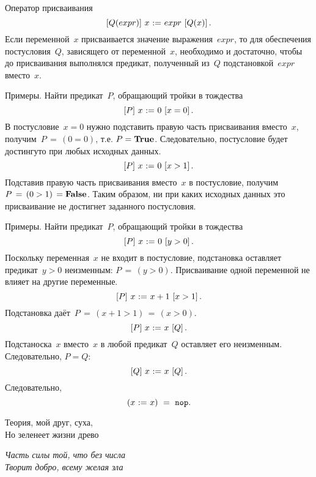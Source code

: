 \documentclass[landscape]{slides}
\begin{document}
\begin{slide}
        Оператор присваивания
        \[
                \left[ Q(expr) \right] \, {x\ \mathtt{:=}\  expr} \, \left[ Q(x) \right] .
        \]
        Если переменной~$x$ присваивается значение выражения~$expr$, то для обеспечения постусловия~$Q$, зависящего от переменной~$x$, необходимо и
        достаточно, чтобы до присваивания выполнялся предикат, полученный из~$Q$ подстановкой~$expr$ вместо~$x$.

        Примеры. Найти предикат~$P$, обращающий тройки в тождества
        \[
                \left[ P \right] \, {x\ \mathtt{:=}\  0} \, \left[ x=0 \right] .
        \]
        В постусловие~$x=0$ нужно подставить правую часть присваивания вместо~$x$, получим~$P\, =\, (0=0)$, т.е. $P = \mathbf{True}$. Следовательно, постусловие будет достингуто при любых исходных данных.
        \[
                \left[ P \right] \, {x\ \mathtt{:=}\  0} \, \left[ x>1 \right] .
        \]
        Подставив правую часть присваивания вместо~$x$ в постусловие, получим $P\, =\, (0>1)\, = \mathbf{False}$. Таким образом, ни при каких исходных данных это присваивание не достигнет заданного постусловия.
\end{slide}

\begin{slide}
        Примеры. Найти предикат~$P$, обращающий тройки в тождества
        \[
                \left[ P \right] \, {x\ \mathtt{:=}\  0} \, \left[ y>0 \right] .
        \]
        Поскольку переменная~$x$ не входит в постусловие, подстановка оставляет предикат~$y>0$ неизменным: $P\, =\, (y>0)$. Присваивание одной переменной не влияет на другие переменные.
        \[
                \left[ P \right] \, {x\ \mathtt{:=}\  x+1} \, \left[ x>1 \right] .
        \]
        Подстановка даёт~$P\, =\, (x+1 > 1)\, =\, (x>0)$.
        \[
                \left[ P \right] \, {x\ \mathtt{:=}\  x} \, \left[ Q \right] .
        \]
        Подстаноска~$x$ вместо~$x$ в любой предикат~$Q$ оставляет его неизменным. Следовательно, $P=Q$:
        \[
                \left[ Q \right] \, {x\ \mathtt{:=}\  x} \, \left[ Q \right] .
        \]
        Следовательно,
        \[
                (x\ \mathtt{:=}\  x)\ = \ \mathtt{nop} .
        \]
\end{slide}

\begin{slide}
\begin{center}
\begin{LARGE}
Теория, мой друг, суха,\\Но зеленеет жизни древо
\end{LARGE}
\end{center}

\begin{flushright}
\emph{Часть силы той, что без числа\\Творит добро, всему желая зла}
\end{flushright}
\end{slide}
\end{document}
